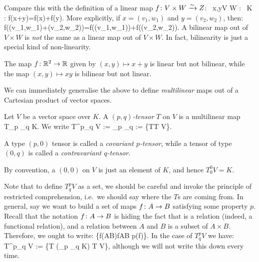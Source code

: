 \br
Compare this with the definition of a linear map $f\colon V\times W \xrightarrow{\sim} Z$:
\bse
\forall \, x,y\in V \times W : \forall \, \lambda \in K : f(\lambda x+y)=\lambda f(x)+f(y).
\ese
More explicitly, if $x=(v_1,w_1)$ and $y = (v_2,w_2)$, then:
\bse
f(\lambda (v_1,w_1)+(v_2,w_2))=\lambda f((v_1,w_1))+f((v_2,w_2)).
\ese
A bilinear map out of $V\times W$ is \emph{not} the same as a linear map out of $V\times W$. In fact, bilinearity is just a special kind of non-linearity.
\er

\be
The map $f\colon \mathbb{R}^2\to \mathbb{R}$ given by $(x,y)\mapsto x+y$ is linear but not bilinear, while the map $(x,y)\mapsto xy$ is bilinear but not linear.
\ee

We can immediately generalise the above to define \emph{multilinear} maps out of a Cartesian product of vector spaces.

\bd
Let $V$ be a vector space over $K$. A \emph{$(p,q)$-tensor} $T$ on $V$ is a multilinear map
\bse
T\cl {}_{p } \times {}_{q } \to K.
\ese
We write
\bse
T^p_q V := _{p } \otimes {}_{q } := \{T\mid T V\}. 
\ese
\ed

\bd
A type $(p,0)$ tensor is called a \emph{covariant $p$-tensor}, while a tensor of type $(0,q)$ is called a \emph{contravariant $q$-tensor}.
\ed

\br
By convention, a $(0,0)$ on $V$ is just an element of $K$, and hence $T^0_0V=K$.
\er

\br
Note that to define $T^p_q V$ as a set, we should be careful and invoke the principle of restricted comprehension, i.e.\ we should say where the $T$s are coming from. In general, say we want to build a set of maps $f\colon A\to B$ satisfying some property $p$. Recall that the notation $f\colon A \to B$ is hiding the fact that is a relation (indeed, a functional relation), and a relation between $A$ and $B$ is a subset of $A\times B$. Therefore, we ought to write:
\bse
\{f\in \cP(A\times B)\mid f\cl A\to B  p(f)\}.
\ese
In the case of $T^p_q V$ we have:
\bse
T^p_q V := \big\{T \in \cP\bigl(_{p } \times {}_{q } \times K\bigr) \mid  T V\big\},
\ese
although we will not write this down every time.
\er

